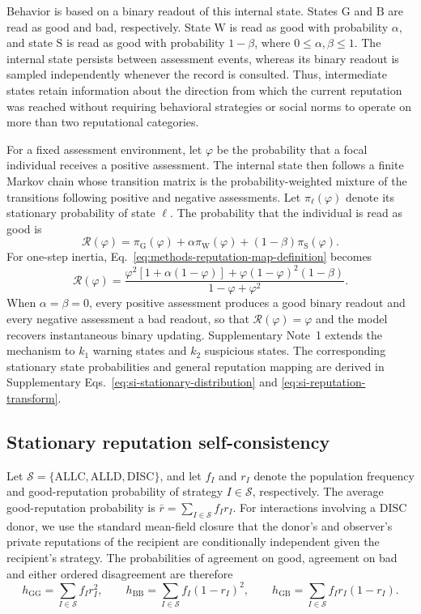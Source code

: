 \documentclass[fleqn,10pt]{wlscirep}
\begin{document}
Behavior is based on a binary readout of this internal state. States $\mathrm{G}$ and $\mathrm{B}$ are read as good and bad, respectively. State $\mathrm{W}$ is read as good with probability $\alpha$, and state $\mathrm{S}$ is read as good with probability $1-\beta$, where $0\leq\alpha,\beta\leq1$. The internal state persists between assessment events, whereas its binary readout is sampled independently whenever the record is consulted. Thus, intermediate states retain information about the direction from which the current reputation was reached without requiring behavioral strategies or social norms to operate on more than two reputational categories.

For a fixed assessment environment, let $\varphi$ be the probability that a focal individual receives a positive assessment. The internal state then follows a finite Markov chain whose transition matrix is the probability-weighted mixture of the transitions following positive and negative assessments. Let $\pi_{\ell}(\varphi)$ denote its stationary probability of state $\ell$. The probability that the individual is read as good is
\begin{equation}
\mathcal R(\varphi)
=\pi_{\mathrm{G}}(\varphi)
+\alpha\pi_{\mathrm{W}}(\varphi)
+(1-\beta)\pi_{\mathrm{S}}(\varphi).
\label{eq:methods-reputation-map-definition}
\end{equation}
For one-step inertia, Eq.~\eqref{eq:methods-reputation-map-definition} becomes
\begin{equation}
\mathcal R(\varphi)
=\frac{
\varphi^2\left[1+\alpha(1-\varphi)\right]
+\varphi(1-\varphi)^2(1-\beta)
}{1-\varphi+\varphi^2}.
\label{eq:methods-reputation-map}
\end{equation}
When $\alpha=\beta=0$, every positive assessment produces a good binary readout and every negative assessment a bad readout, so that $\mathcal R(\varphi)=\varphi$ and the model recovers instantaneous binary updating. Supplementary Note~1 extends the mechanism to $k_1$ warning states and $k_2$ suspicious states. The corresponding stationary state probabilities and general reputation mapping are derived in Supplementary Eqs.~\eqref{eq:si-stationary-distribution} and \eqref{eq:si-reputation-transform}.

\subsection*{Stationary reputation self-consistency}

Let $\mathcal S=\{\mathrm{ALLC},\mathrm{ALLD},\mathrm{DISC}\}$, and let $f_I$ and $r_I$ denote the population frequency and good-reputation probability of strategy $I\in\mathcal S$, respectively. The average good-reputation probability is $\bar r=\sum_{I\in\mathcal S}f_Ir_I$. For interactions involving a $\mathrm{DISC}$ donor, we use the standard mean-field closure that the donor's and observer's private reputations of the recipient are conditionally independent given the recipient's strategy. The probabilities of agreement on good, agreement on bad and either ordered disagreement are therefore
\[
h_{\mathrm{GG}}=\sum_{I\in\mathcal S}f_Ir_I^2,
\qquad
h_{\mathrm{BB}}=\sum_{I\in\mathcal S}f_I(1-r_I)^2,
\qquad
h_{\mathrm{GB}}=\sum_{I\in\mathcal S}f_Ir_I(1-r_I).
\]
\end{document}
